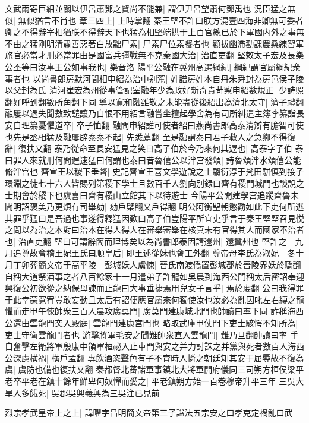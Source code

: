 文武兩寄巨細並關以伊呂蕭鄧之賢尚不能兼|{
	謂伊尹呂望蕭何鄧禹也}
況臣猛之無似|{
	無似猶言不肖也}
章三四上|{
	上時掌翻}
秦王堅不許曰朕方混壹四海非卿無可委者卿之不得辭宰相猶朕不得辭天下也猛為相堅端拱于上百官總已於下軍國内外之事無不由之猛剛明清肅善惡著白放黜尸素|{
	尸素尸位素餐者也}
顯拔幽滯勸課農桑練習軍旅官必當才刑必當罪由是國富兵彊戰無不克秦國大治|{
	治直吏翻}
堅敕太子宏及長樂公丕等曰汝事王公如事我也|{
	樂音洛}
陽平公融在冀州高選綱紀|{
	綱紀謂官屬綱紀衆事者也}
以尚書郎房默河間相申紹為治中别駕|{
	姓譜房姓本自丹朱舜封為房邑侯子陵以父封為氏}
清河崔宏為州從事管記室融年少為政好新奇貴苛察申紹數規正|{
	少詩照翻好呼到翻數所角翻下同}
導以寛和融雖敬之未能盡從後紹出為濟北太守|{
	濟子禮翻}
融屢以過失聞數致譴讓乃自恨不用紹言融嘗坐擅起學舍為有司所糾遣主簿李纂詣長安自理纂憂懼道卒|{
	卒子恤翻}
融問申紹誰可使者紹曰燕尚書郎高泰清辯有膽智可使也先是丞相猛及融屢辟泰泰不起|{
	先悉薦翻}
至是融謂泰曰君子救人之急卿不得復辭|{
	復扶又翻}
泰乃從命至長安猛見之笑曰高子伯於今乃來何其遟也|{
	高泰字子伯}
泰曰罪人來就刑何問遟速猛曰何謂也泰曰昔魯僖公以泮宫發頌|{
	詩魯頌泮水頌僖公能脩泮宫也}
齊宣王以稷下垂聲|{
	史記齊宣王喜文學遊說之士騶衍淳于髠田駢慎到接子環淵之徒七十六人皆賜列第稷下學士且數百千人劉向别録曰齊有稷門城門也談說之士期會於稷下也虞喜曰齊有稷山立館其下以待遊士}
今陽平公開建學宫追蹤齊魯未聞明詔褒美乃更煩有司舉劾|{
	劾戶槩翻又戶得翻}
明公阿衡聖朝懲勸如此下吏何所逃其罪乎猛曰是吾過也事遂得釋猛因歎曰高子伯豈陽平所宜吏乎言于秦王堅堅召見悦之問以為治之本對曰治本在得人得人在審舉審舉在核真未有官得其人而國家不治者也|{
	治直吏翻}
堅曰可謂辭簡而理博矣以為尚書郎泰固請還州|{
	還冀州也}
堅許之　九月追尊故會稽王妃王氏曰順皇后|{
	即王述從妹也會工外翻}
尊帝母李氏為淑妃　冬十月丁卯葬簡文帝于高平陵　彭城妖人盧悚|{
	晉氏南渡僑置彭城郡於晉陵界妖於驕翻}
自稱大道祭酒事之者八百餘家十一月遣弟子許龍如吳晨到海西公門稱太后密詔奉迎興復公初欲從之納保母諫而止龍曰大事垂捷焉用兒女子言乎|{
	焉於䖍翻}
公曰我得罪于此幸蒙寛宥豈敢妄動且太后有詔便應官屬來何獨使汝也汝必為亂因叱左右縛之龍懼而走甲午悚帥衆三百人晨攻廣莫門|{
	廣莫門建康城北門也帥讀曰率下同}
詐稱海西公還由雲龍門突入殿庭|{
	雲龍門建康宫門也}
略取武庫甲仗門下吏士駭愕不知所為|{
	吏士守衛雲龍門者也}
游擊將軍毛安之聞難帥衆直入雲龍門|{
	難乃旦翻帥讀曰率}
手自奮擊左衛將軍殷康中領軍桓祕入止車門與安之并力討誅之并黨與死者數百人海西公深慮横禍|{
	横戶孟翻}
專飲酒恣聲色有子不育時人憐之朝廷知其安于屈辱故不復為虞|{
	虞防也備也復扶又翻}
秦都督北蕃諸軍事鎮北大將軍開府儀同三司朔方桓侯梁平老卒平老在鎮十餘年鮮卑匈奴憚而愛之|{
	平老鎮朔方始一百卷穆帝升平三年}
三吳大旱人多餓死|{
	吳郡吳興義興為三吳注已見前}


烈宗孝武皇帝上之上|{
	諱曜字昌明簡文帝第三子諡法五宗安之曰孝克定禍亂曰武}



